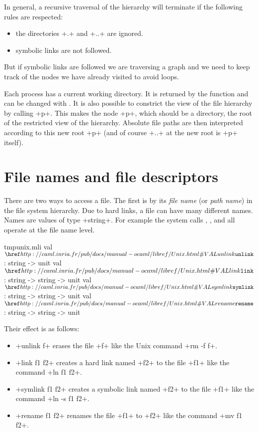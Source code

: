 In general, a recursive traversal of the hierarchy will terminate
if the following rules are respected:
%
\begin{itemize}
\item the directories \ml+.+ and \ml+..+ are ignored.
\item symbolic links are not followed. 
\end{itemize}
% 
But if symbolic links are followed we are traversing a graph and
we need to keep track of the nodes we have already visited to avoid loops.

Each process has a current working directory. It is returned by the
function  and can be changed with
.  It is also possible to constrict the
view of the file hierarchy by calling 
 \ml+p+. This makes the node \ml+p+, which 
should be a directory, the root of the restricted view of the
hierarchy. Absolute file paths are then
interpreted according to this new root \ml+p+ (and of course \ml+..+ at the
new root is \ml+p+ itself).

\section{File names and file descriptors}

There are two ways to access a file.  The first is by its \emph{file
  name} (or \emph{path name}) in the file system hierarchy.  Due to
hard links, a file can have many different names.  Names are values of
type \ml+string+. For example the system calls ,
,  and  all operate at
the file name level.
%
\begin{listingcodefile}{tmpunix.mli}
val $\libvalue{Unix}{unlink}$ : string -> unit
val $\libvalue{Unix}{link}$ : string -> string -> unit
val $\libvalue{Unix}{symlink}$ : string -> string -> unit
val $\libvalue{Unix}{rename}$ : string -> string -> unit
\end{listingcodefile}
% 
Their effect is as follows:
\begin{itemize}
\item \ml+unlink f+ erases the file \ml+f+ like the Unix command
\ml+rm -f f+.
%
\item \ml+link f1 f2+ creates a hard link named \ml+f2+ to
the file \ml+f1+ like the command \ml+ln f1 f2+.
%
\item \ml+symlink f1 f2+ creates a symbolic link named \ml+f2+ to the file 
\ml+f1+ like the command \ml+ln -s f1 f2+. 
%
\item \ml+rename f1 f2+ renames the file \ml+f1+ to \ml+f2+ 
like the command \ml+mv f1 f2+.
\end{itemize}

